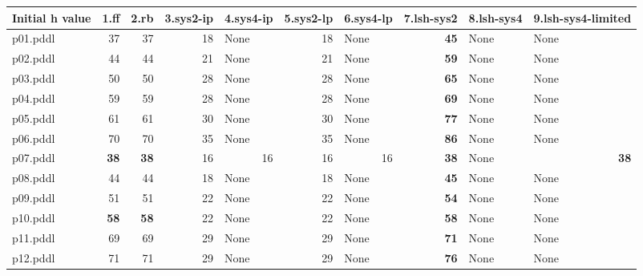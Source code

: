 \documentclass{article}
\begin{document}
\begin{tabular}{@{}lrrrrrrrrr@{}}
Initial h value & 1.ff & 2.rb & 3.sys2-ip & 4.sys4-ip & 5.sys2-lp & 6.sys4-lp & 7.lsh-sys2 & 8.lsh-sys4 & 9.lsh-sys4-limited \\
\midrule
p01.pddl & 37 & 37 & 18 & \multicolumn{1}{|l|}{None} & 18 & \multicolumn{1}{|l|}{None} & \textbf{45} & \multicolumn{1}{|l|}{None} & \multicolumn{1}{|l|}{None} \\
p02.pddl & 44 & 44 & 21 & \multicolumn{1}{|l|}{None} & 21 & \multicolumn{1}{|l|}{None} & \textbf{59} & \multicolumn{1}{|l|}{None} & \multicolumn{1}{|l|}{None} \\
p03.pddl & 50 & 50 & 28 & \multicolumn{1}{|l|}{None} & 28 & \multicolumn{1}{|l|}{None} & \textbf{65} & \multicolumn{1}{|l|}{None} & \multicolumn{1}{|l|}{None} \\
p04.pddl & 59 & 59 & 28 & \multicolumn{1}{|l|}{None} & 28 & \multicolumn{1}{|l|}{None} & \textbf{69} & \multicolumn{1}{|l|}{None} & \multicolumn{1}{|l|}{None} \\
p05.pddl & 61 & 61 & 30 & \multicolumn{1}{|l|}{None} & 30 & \multicolumn{1}{|l|}{None} & \textbf{77} & \multicolumn{1}{|l|}{None} & \multicolumn{1}{|l|}{None} \\
p06.pddl & 70 & 70 & 35 & \multicolumn{1}{|l|}{None} & 35 & \multicolumn{1}{|l|}{None} & \textbf{86} & \multicolumn{1}{|l|}{None} & \multicolumn{1}{|l|}{None} \\
p07.pddl & \textbf{38} & \textbf{38} & 16 & 16 & 16 & 16 & \textbf{38} & \multicolumn{1}{|l|}{None} & \textbf{38} \\
p08.pddl & 44 & 44 & 18 & \multicolumn{1}{|l|}{None} & 18 & \multicolumn{1}{|l|}{None} & \textbf{45} & \multicolumn{1}{|l|}{None} & \multicolumn{1}{|l|}{None} \\
p09.pddl & 51 & 51 & 22 & \multicolumn{1}{|l|}{None} & 22 & \multicolumn{1}{|l|}{None} & \textbf{54} & \multicolumn{1}{|l|}{None} & \multicolumn{1}{|l|}{None} \\
p10.pddl & \textbf{58} & \textbf{58} & 22 & \multicolumn{1}{|l|}{None} & 22 & \multicolumn{1}{|l|}{None} & \textbf{58} & \multicolumn{1}{|l|}{None} & \multicolumn{1}{|l|}{None} \\
p11.pddl & 69 & 69 & 29 & \multicolumn{1}{|l|}{None} & 29 & \multicolumn{1}{|l|}{None} & \textbf{71} & \multicolumn{1}{|l|}{None} & \multicolumn{1}{|l|}{None} \\
p12.pddl & 71 & 71 & 29 & \multicolumn{1}{|l|}{None} & 29 & \multicolumn{1}{|l|}{None} & \textbf{76} & \multicolumn{1}{|l|}{None} & \multicolumn{1}{|l|}{None} \\

\end{tabular}
\end{document}
